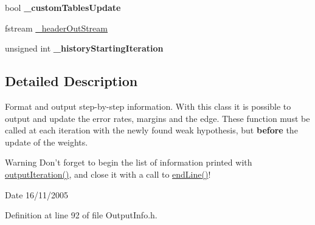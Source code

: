 \begin{DoxyCompactItemize}
\item 
\hypertarget{classMultiBoost_1_1OutputInfo_a52ee1e8382ca696534809caba70b7de3}{bool {\bfseries \-\_\-custom\-Tables\-Update}}\label{classMultiBoost_1_1OutputInfo_a52ee1e8382ca696534809caba70b7de3}

\item 
fstream \hyperlink{classMultiBoost_1_1OutputInfo_a18631871093bb6fb65a4ebb0e50909a4}{\-\_\-header\-Out\-Stream}
\item 
\hypertarget{classMultiBoost_1_1OutputInfo_a7bfc2b437c1772c4e09966e875d3d391}{unsigned int {\bfseries \-\_\-history\-Starting\-Iteration}}\label{classMultiBoost_1_1OutputInfo_a7bfc2b437c1772c4e09966e875d3d391}

\end{DoxyCompactItemize}


\subsection{Detailed Description}
Format and output step-\/by-\/step information. With this class it is possible to output and update the error rates, margins and the edge. These function must be called at each iteration with the newly found weak hypothesis, but {\bfseries before} the update of the weights. \begin{DoxyWarning}{Warning}
Don't forget to begin the list of information printed with \hyperlink{classMultiBoost_1_1OutputInfo_ac9210d45cb3c2ed39365f55bd63d1c76}{output\-Iteration()}, and close it with a call to \hyperlink{classMultiBoost_1_1OutputInfo_a4d9d20e123fdc12c5d4999d6ae6e444a}{end\-Line()}! 
\end{DoxyWarning}
\begin{DoxyDate}{Date}
16/11/2005 
\end{DoxyDate}


Definition at line 92 of file Output\-Info.\-h.



